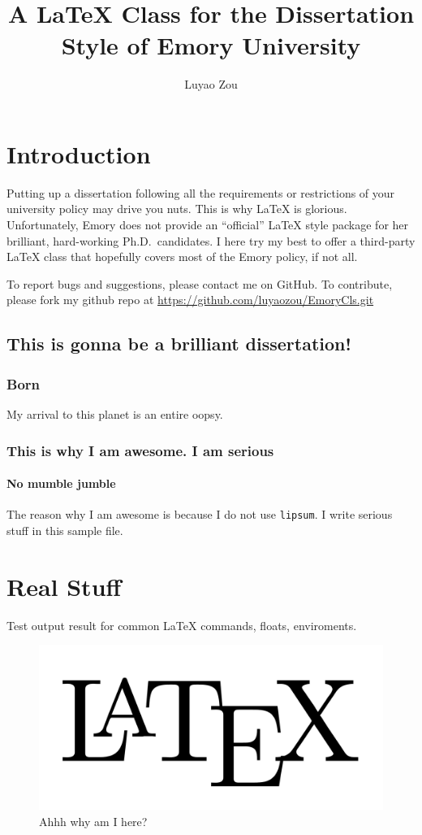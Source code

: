 \documentclass[draft,12pt]{emory}
\title{A \LaTeX{} Class for the Dissertation Style of Emory University}
\author{Luyao Zou}                      %
\begin{document}
\chapter{Introduction}
Putting up a dissertation following all the requirements or restrictions of
your university policy may drive you nuts. This is why \LaTeX{} is glorious. 
Unfortunately, Emory does not provide an ``official'' \LaTeX{} style package for
her brilliant, hard-working Ph.D.\ candidates. I here try my best to offer a
third-party \LaTeX{} class that hopefully covers most of the Emory policy, if not
all.

To report bugs and suggestions, please contact me on GitHub. To contribute, 
please fork my github repo at \url{https://github.com/luyaozou/EmoryCls.git}
  
\section{This is gonna be a brilliant dissertation!}
\subsection{Born}
My arrival to this planet is an entire oopsy. 


\subsection{This is why I am awesome. I am serious}
\subsubsection{No mumble jumble}
The reason why I am awesome is because I do not use \verb|lipsum|. I write 
serious stuff in this sample file.

\chapter{Real Stuff}
Test output result for common \LaTeX{} commands, floats, enviroments.

\begin{figure}[htp!]
  \centering
  \includegraphics[width=\textwidth]{LaTeXLogo.png}
  \caption{Ahhh why am I here?}
\end{figure}
\end{document}
